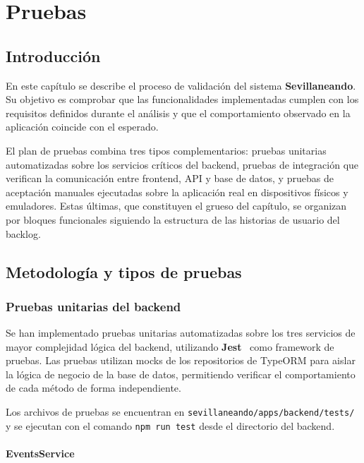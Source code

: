 \chapter{Pruebas}\label{cap:pruebas}

\section{Introducción}

En este capítulo se describe el proceso de validación del sistema \textbf{Sevillaneando}. Su objetivo es comprobar que las funcionalidades implementadas cumplen con los requisitos definidos durante el análisis y que el comportamiento observado en la aplicación coincide con el esperado.

El plan de pruebas combina tres tipos complementarios: pruebas unitarias automatizadas sobre los servicios críticos del backend, pruebas de integración que verifican la comunicación entre frontend, API y base de datos, y pruebas de aceptación manuales ejecutadas sobre la aplicación real en dispositivos físicos y emuladores. Estas últimas, que constituyen el grueso del capítulo, se organizan por bloques funcionales siguiendo la estructura de las historias de usuario del backlog.

\section{Metodología y tipos de pruebas}

\subsection{Pruebas unitarias del backend}

Se han implementado pruebas unitarias automatizadas sobre los tres servicios de mayor complejidad lógica del backend, utilizando \textbf{Jest}~\cite{jest} como framework de pruebas. Las pruebas utilizan mocks de los repositorios de TypeORM para aislar la lógica de negocio de la base de datos, permitiendo verificar el comportamiento de cada método de forma independiente.

Los archivos de pruebas se encuentran en \texttt{sevillaneando/apps/backend/tests/} y se ejecutan con el comando \texttt{npm run test} desde el directorio del backend.

\subsubsection{EventsService}

